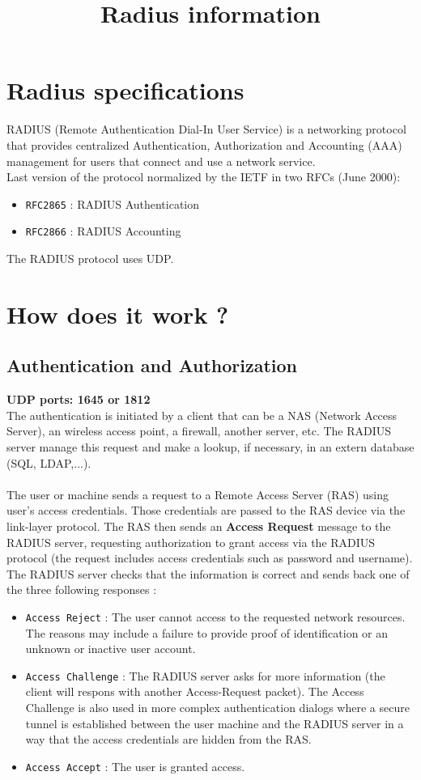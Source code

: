 \documentclass[10pt,a4paper]{article}
\title{Radius information}
\begin{document}
\maketitle
\section{Radius specifications}
RADIUS (Remote Authentication Dial-In User Service) is a networking protocol that provides centralized Authentication, Authorization and Accounting (AAA) management for users that connect and use a network service.\\
Last version of the protocol normalized by the IETF in two RFCs (June 2000): 
\begin{itemize}
\item \texttt{RFC2865} : RADIUS Authentication
\item \texttt{RFC2866} : RADIUS Accounting
\end{itemize}
The RADIUS protocol uses UDP.
\section{How does it work ?}
\subsection{Authentication and Authorization}
\textbf{UDP ports: 1645 or 1812}\\
The authentication is initiated by a client that can be a NAS (Network Access Server), an wireless access point, a firewall, another server, etc. The RADIUS server manage this request and make a lookup, if necessary, in an extern database (SQL, LDAP,...).\\\\
The user or machine sends a request to a Remote Access Server (RAS) using user's access credentials. Those credentials are passed to the RAS device via the link-layer protocol. The RAS then sends an \textbf{Access Request} message to the RADIUS server, requesting authorization to grant access via the RADIUS protocol (the request includes access credentials such as password and username).\\
The RADIUS server checks that the information is correct and sends back one of the three following responses :
\begin{itemize}
\item \texttt{Access Reject} : The user cannot access to the requested network resources. The reasons may include a failure to provide proof of identification or an unknown or inactive user account.
\item \texttt{Access Challenge} : The RADIUS server asks for more information (the client will respons with another Access-Request packet). The Access Challenge is also used in more complex authentication dialogs where a secure tunnel is established between the user machine and the RADIUS server in a way that the access credentials are hidden from the RAS.
\item \texttt{Access Accept} : The user is granted access.
\end{itemize}
\end{document}
